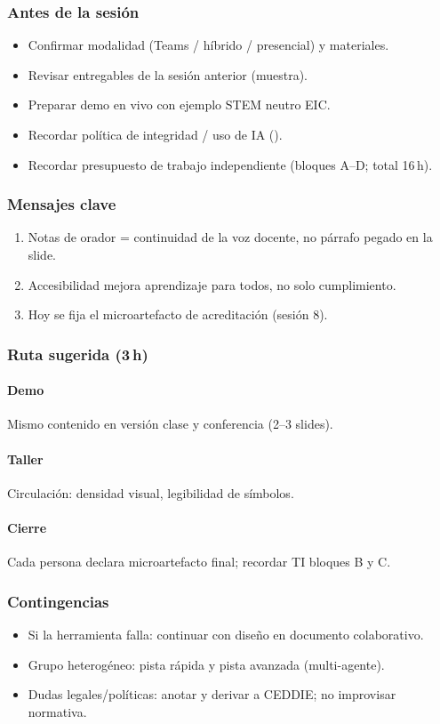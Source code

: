 \subsubsection*{Antes de la sesión}
\begin{itemize}
\item[$\square$] Confirmar modalidad (Teams / híbrido / presencial) y materiales.
\item[$\square$] Revisar entregables de la sesión anterior (muestra).
\item[$\square$] Preparar demo en vivo con ejemplo STEM neutro EIC.
\item[$\square$] Recordar política de integridad / uso de IA (\ceddie).
\item[$\square$] Recordar presupuesto de trabajo independiente (bloques A--D; total 16\,h).
\end{itemize}

\subsubsection*{Mensajes clave}
\begin{enumerate}
\item Notas de orador = continuidad de la voz docente, no párrafo pegado en la slide.
\item Accesibilidad mejora aprendizaje para todos, no solo cumplimiento.
\item Hoy se fija el microartefacto de acreditación (sesión 8).
\end{enumerate}

\subsubsection*{Ruta sugerida (3\,h)}
\paragraph{Demo} Mismo contenido en versión clase y conferencia (2--3 slides).
\paragraph{Taller} Circulación: densidad visual, legibilidad de símbolos.
\paragraph{Cierre} Cada persona declara microartefacto final; recordar TI bloques B y C.

\subsubsection*{Contingencias}
\begin{itemize}
\item Si la herramienta falla: continuar con diseño en documento colaborativo.
\item Grupo heterogéneo: pista rápida y pista avanzada (multi-agente).
\item Dudas legales/políticas: anotar y derivar a CEDDIE; no improvisar normativa.
\end{itemize}

